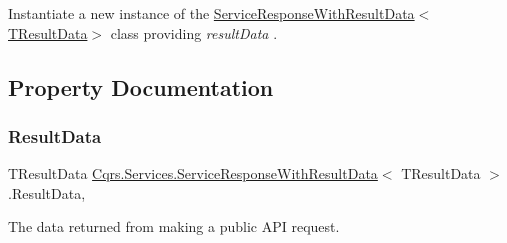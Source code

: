Instantiate a new instance of the \hyperlink{classCqrs_1_1Services_1_1ServiceResponseWithResultData_a4241511df21804b73baec2b0c2e66402_a4241511df21804b73baec2b0c2e66402}{Service\+Response\+With\+Result\+Data$<$\+T\+Result\+Data$>$} class providing {\itshape result\+Data} . 



\subsection{Property Documentation}
\mbox{\label{classCqrs_1_1Services_1_1ServiceResponseWithResultData_ab0768d40341eb667f362e5ddc8412810_ab0768d40341eb667f362e5ddc8412810}} 
\subsubsection{\texorpdfstring{Result\+Data}{ResultData}}
{\footnotesize\ttfamily T\+Result\+Data \hyperlink{classCqrs_1_1Services_1_1ServiceResponseWithResultData}{Cqrs.\+Services.\+Service\+Response\+With\+Result\+Data}$<$ T\+Result\+Data $>$.Result\+Data\hspace{0.3cm}{\ttfamily [get]}, {\ttfamily [set]}}



The data returned from making a public A\+PI request. 

